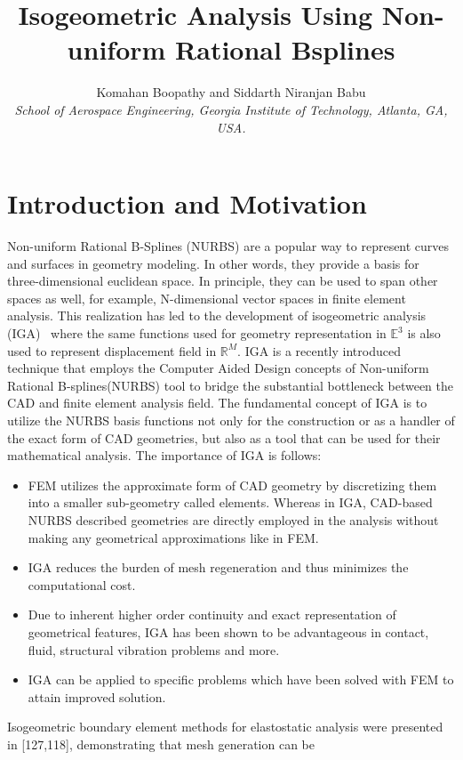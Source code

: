 \documentclass[submit,12pt]{aiaa-pretty} %
\title{Isogeometric Analysis Using Non-uniform Rational Bsplines}
\author{Komahan Boopathy  and Siddarth Niranjan Babu\\
  {\normalsize\itshape School of Aerospace Engineering, Georgia Institute of Technology,
    Atlanta, GA, USA. }
}
\begin{document}
\maketitle
    
\section{Introduction and Motivation}
Non-uniform Rational B-Splines (NURBS) \cite{Piegl:NurbsBook} are a
popular way to represent curves and surfaces in geometry modeling. In
other words, they provide a basis for three-dimensional euclidean
space. In principle, they can be used to span other spaces as well,
for example, N-dimensional vector spaces in finite element
analysis. This realization has led to the development of isogeometric
analysis
(IGA)~\cite{HUGHES20054135,KACPRZYK201487,NGUYEN201589,Agrawal2018,Milic2013,Simpson}
where the same functions used for geometry representation in
$\mathbb{E}^3$ is also used to represent displacement field in
$\mathbb{R}^M$.
IGA is a recently introduced technique that employs the Computer Aided
Design concepts of Non-uniform Rational B-splines(NURBS) tool to
bridge the substantial bottleneck between the CAD and finite element
analysis field. The fundamental concept of IGA is to utilize the NURBS
basis functions not only for the construction or as a handler of the
exact form of CAD geometries, but also as a tool that can be used for
their mathematical analysis.
The importance of IGA is follows:
\begin{itemize}
  \item FEM utilizes the approximate form of CAD geometry by discretizing them into a smaller sub-geometry called elements. Whereas in IGA, CAD-based NURBS described geometries are directly employed in the analysis without making any geometrical approximations like in FEM.
  \item IGA reduces the burden of mesh regeneration and thus minimizes the computational cost. %
  \item Due to inherent higher order continuity and exact representation of geometrical features, IGA has been shown to be advantageous in contact, fluid, structural vibration problems and more. 
  \item IGA can be applied to specific problems which have been solved with FEM to attain improved solution.
\end{itemize}
Isogeometric boundary element methods for elastostatic analysis were
presented in [127,118], demonstrating that mesh generation can be
\end{document}
